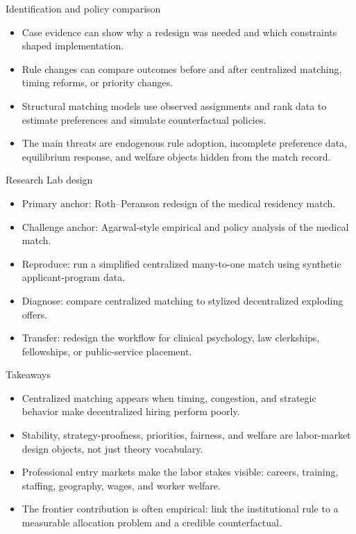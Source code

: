 \documentclass[aspectratio=169,11pt]{beamer}
\begin{document}
\begin{frame}{Identification and policy comparison}
\begin{itemize}
    \item Case evidence can show why a redesign was needed and which constraints shaped implementation.
    \item Rule changes can compare outcomes before and after centralized matching, timing reforms, or priority changes.
    \item Structural matching models use observed assignments and rank data to estimate preferences and simulate counterfactual policies.
    \item The main threats are endogenous rule adoption, incomplete preference data, equilibrium response, and welfare objects hidden from the match record.
\end{itemize}
\end{frame}

\begin{frame}{Research Lab design}
\begin{itemize}
    \item Primary anchor: Roth--Peranson redesign of the medical residency match.
    \item Challenge anchor: Agarwal-style empirical and policy analysis of the medical match.
    \item Reproduce: run a simplified centralized many-to-one match using synthetic applicant-program data.
    \item Diagnose: compare centralized matching to stylized decentralized exploding offers.
    \item Transfer: redesign the workflow for clinical psychology, law clerkships, fellowships, or public-service placement.
\end{itemize}
\end{frame}

\begin{frame}{Takeaways}
\begin{itemize}
    \item Centralized matching appears when timing, congestion, and strategic behavior make decentralized hiring perform poorly.
    \item Stability, strategy-proofness, priorities, fairness, and welfare are labor-market design objects, not just theory vocabulary.
    \item Professional entry markets make the labor stakes visible: careers, training, staffing, geography, wages, and worker welfare.
    \item The frontier contribution is often empirical: link the institutional rule to a measurable allocation problem and a credible counterfactual.
\end{itemize}
\end{frame}
\end{document}
